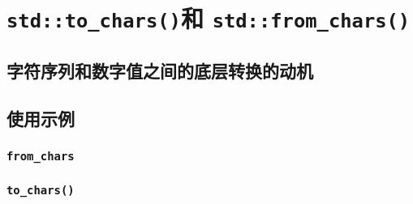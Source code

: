\chapter{\texttt{std::to\_chars()}和
\texttt{std::from\_chars()}}\label{ch31}

\section{字符序列和数字值之间的底层转换的动机}

\section{使用示例}

\subsection{\texttt{from\_chars}}\label{ch31.2.1}

\subsection{\texttt{to\_chars()}}\label{ch31.2.2}
